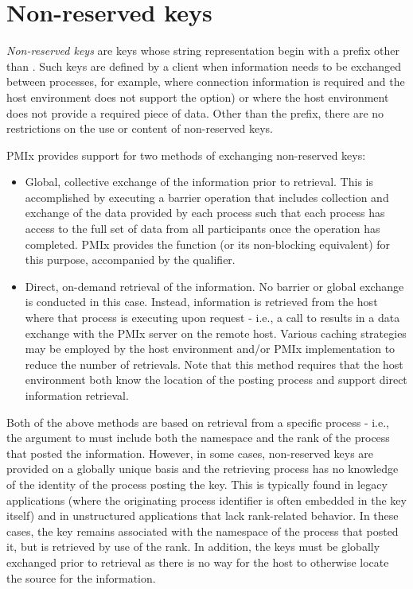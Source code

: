 \section{Non-reserved keys}
\label{chap:data_sharing:non_rsvd_keys}

\emph{Non-reserved keys} are keys whose string representation begin with a
prefix other than . Such keys are defined by a
client when information needs to be exchanged between processes, for example, 
where connection information is required and the host environment does not
support the  option) or where the host environment does not
provide a required piece of data. Other than the prefix, there are no
restrictions on the use or content of non-reserved keys.

\ac{PMIx} provides support for two methods of exchanging non-reserved keys:

\begin{itemize}
    \item Global, collective exchange of the information prior to retrieval. This is accomplished by executing a barrier operation that includes collection and exchange of the data provided by each process such that each process has access to the full set of data from all participants once the operation has completed. \ac{PMIx} provides the  function (or its non-blocking equivalent) for this purpose, accompanied by the  qualifier.
    \item Direct, on-demand retrieval of the information. No barrier or global exchange is conducted in this case. Instead, information is retrieved from the host where that process is executing upon request - i.e., a call to  results in a data exchange with the \ac{PMIx} server on the remote host. Various caching strategies may be employed by the host environment and/or \ac{PMIx} implementation to reduce the number of retrievals. Note that this method requires that the host environment both know the location of the posting process and support direct information retrieval.
\end{itemize}

Both of the above methods are based on retrieval from a specific process -
i.e., the  argument to  must include both the
namespace and the rank of the process that posted the information. However, in
some cases, non-reserved keys are provided on a globally unique basis and the
retrieving process has no knowledge of the identity of the process posting the
key. This is typically found in legacy applications (where the originating
process identifier is often embedded in the key itself) and in unstructured
applications that lack rank-related behavior. In these cases, the key remains
associated with the namespace of the process that posted it, but is retrieved
by use of the  rank. In addition, the keys must be
globally exchanged prior to retrieval as there is no way for the host to
otherwise locate the source for the information.

